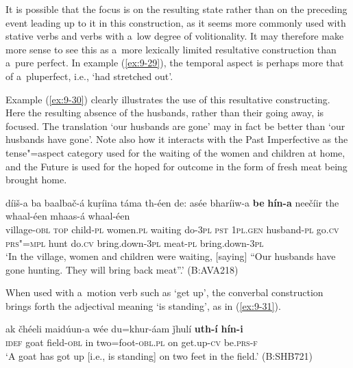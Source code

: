 It is possible that the focus is on the resulting state rather than on the preceding event leading up to it in this construction, as it seems more commonly used with stative verbs and verbs with a~low degree of volitionality. It may therefore make more sense to see this as a~more lexically limited resultative construction \citep[135]{dahl1985} than a~pure perfect. In example (\ref{ex:9-29}), the temporal aspect is perhaps more that of a~pluperfect, i.e., `had stretched out'. 



Example (\ref{ex:9-30}) clearly illustrates the use of this resultative constructing. Here the resulting absence of the husbands, rather than their going away, is focused. The translation `our husbands are gone' may in fact be better than `our husbands have gone'. Note also how it interacts with the Past Imperfective as the tense"=aspect category used for the waiting of the women and children at home, and the Future is used for the hoped for outcome in the form of fresh meat being brought home.
\begin{exe}
\ex
\label{ex:9-30}
\gll díiš-a ba baalbač-á kuṛíina táma th-éen de: asée bharíiw-a \textbf{be} \textbf{hín-a} neečíir the whaal-éen mhaas-á whaal-éen \\
village-\textsc{obl} \textsc{top} child-\textsc{pl} women.\textsc{pl} waiting  do-\textsc{3pl} \textsc{pst } \textsc{1pl.gen} husband-\textsc{pl} go.\textsc{cv} \textsc{prs"=mpl}  hunt do.\textsc{cv} bring.down-\textsc{3pl} meat-\textsc{pl} bring.down-\textsc{3pl} \\
\glt `In the village, women and children were waiting, [saying] ``Our husbands have gone hunting. They will bring back meat''.' (B:AVA218)
\end{exe}

When used with a~motion verb such as `get up', the converbal construction brings forth the adjectival meaning `is standing', as in (\ref{ex:9-31}).

\begin{exe}
\ex
\label{ex:9-31}
\gll ak čhéeli maidúun-a wée du=khur-áam ǰhulí \textbf{uth-í} \textbf{hín-i} \\
\textsc{idef} goat field-\textsc{obl} in two=foot-\textsc{obl.pl} on get.up-\textsc{cv} be.\textsc{prs-f} \\
\glt `A goat has got up [i.e., is standing] on two feet in the field.' (B:SHB721)
\end{exe}

